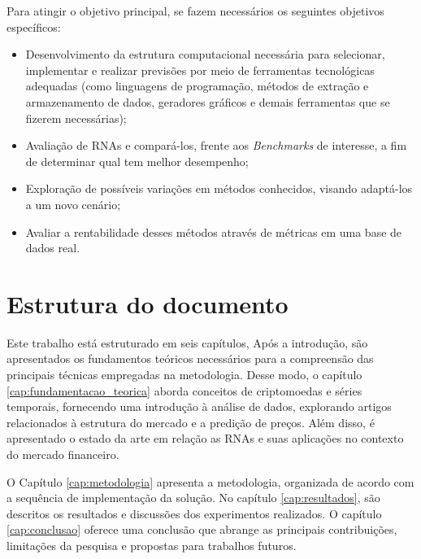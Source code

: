 Para atingir o objetivo principal, se fazem necessários os seguintes objetivos específicos:
\begin{itemize}
    \item Desenvolvimento da estrutura computacional necessária para selecionar, implementar e realizar previsões por meio de ferramentas tecnológicas adequadas (como linguagens de programação, métodos de extração e armazenamento de dados, geradores gráficos e demais ferramentas que se fizerem necessárias);
    \item Avaliação de RNAs e compará-los, frente aos \textit{Benchmarks} de interesse, a fim de determinar qual tem melhor desempenho;
    \item Exploração de possíveis variações em métodos conhecidos, visando adaptá-los a um novo cenário;
    \item Avaliar a rentabilidade desses métodos através de métricas em uma base de dados real.
\end{itemize}

\section{Estrutura do documento}

Este trabalho está estruturado em seis capítulos, Após a introdução, são apresentados os fundamentos teóricos necessários para a compreensão das principais técnicas empregadas na metodologia. 
Desse modo, o capítulo \ref{cap:fundamentacao_teorica} aborda conceitos de criptomoedas e séries temporais, fornecendo uma introdução à análise de dados, explorando artigos relacionados 
à estrutura do mercado e a predição de preços. 
Além disso, é apresentado o estado da arte em relação as RNAs e suas aplicações no contexto do mercado financeiro.

O Capítulo \ref{cap:metodologia} apresenta a metodologia, organizada de acordo com a sequência de implementação da solução.
No capítulo \ref{cap:resultados}, são descritos os resultados e discussões dos experimentos realizados.
O capítulo \ref{cap:conclusao} oferece uma conclusão que abrange as principais contribuições, limitações da pesquisa e propostas para trabalhos futuros.